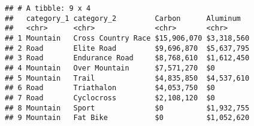 \documentclass[]{article}
\begin{document}
\begin{verbatim}
## # A tibble: 9 x 4
##   category_1 category_2         Carbon      Aluminum  
##   <chr>      <chr>              <chr>       <chr>     
## 1 Mountain   Cross Country Race $15,906,070 $3,318,560
## 2 Road       Elite Road         $9,696,870  $5,637,795
## 3 Road       Endurance Road     $8,768,610  $1,612,450
## 4 Mountain   Over Mountain      $7,571,270  $0        
## 5 Mountain   Trail              $4,835,850  $4,537,610
## 6 Road       Triathalon         $4,053,750  $0        
## 7 Road       Cyclocross         $2,108,120  $0        
## 8 Mountain   Sport              $0          $1,932,755
## 9 Mountain   Fat Bike           $0          $1,052,620
\end{verbatim}
\end{document}
